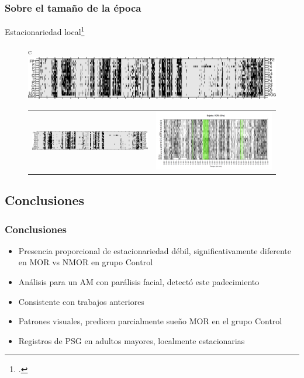 \documentclass{beamer}
\begin{document}
\begin{frame}\frametitle{Sobre el tama\~no de la \'epoca}
{\small Estacionariedad local\footcite{Cohen77}}
\begin{figure}
\centering
\begin{tabular}{c}
\includegraphics[width=0.4\linewidth]
{./img_ejemplos/VCNNS1_est_30.png} \\
\begin{tabular}{cc}
\includegraphics[width=0.4\linewidth]
{./img_ejemplos/VCNNS1_est_60.png} 
&
\includegraphics[width=0.4\linewidth]
{./img_ejemplos/VCNNS1_est_10.png} 
\end{tabular}
\end{tabular}
\end{figure}
\end{frame}


\subsection{Conclusiones}

\begin{frame}\frametitle{Conclusiones}
\begin{itemize}
\item Presencia proporcional de estacionariedad d\'ebil, significativamente diferente en MOR vs 
NMOR en grupo Control

\item An\'alisis para un AM con par\'alisis facial, detect\'o este padecimiento

\item Consistente con trabajos anteriores %

\item Patrones visuales, predicen parcialmente sue\~no MOR en el grupo Control

\item Registros de PSG en adultos mayores, localmente estacionarias
\end{itemize}
\end{frame}
\end{document}
